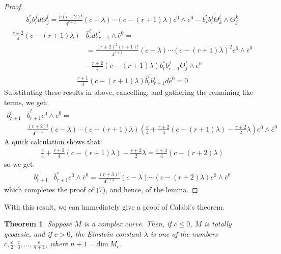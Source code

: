 \documentclass[11pt]{amsart}
\newtheorem{thm}[subsection]{Theorem}
\theoremstyle{definition}
\def \dim{ \text{dim} }
\begin{document}
\begin{proof}
%
\begin{align*}
\bar{b}^i_r b^j_r d \Theta^i_j = \frac{c(r+2)!}{4^{r+2}} (c - \lambda) \cdots (c - (r+1) \lambda) e^0 \wedge \bar{e}^0 - \bar{b}^i_r b^j_r \Theta^i_k \wedge \Theta^k_j
\end{align*}
%
\begin{align*}
\frac{r+2}{4}( c  - (r+1) \lambda ) & \bar{b}^i_r d b^i_{r-1} \wedge \bar{e}^0 = \\
&= \frac{ (r+2)^2 (r+1)!}{4^{r+2}} (c - \lambda) \cdots (c - (r+1) \lambda)^2 e^0 \wedge \bar{e}^0 \\
&- \frac{r+2}{4}(c - (r+1) \lambda) \bar{b}^i_r b^j_{r-1} \Theta^i_j \wedge \bar{e}^0
\end{align*}
%
\begin{align*}
\frac{r+1}{4} (c - (r+1) \lambda ) \bar{b}^i_r b^i_{r+1} d \bar{e}^0 = 0
\end{align*}
%
Substituting these results in above, cancelling, and gathering the remaining like terms, we get:
%
\begin{align*}
b^i_{r+1} & \bar{b}^i_{r+1}  e^0 \wedge \bar{e}^0 = \\
& \frac{(r+2)!}{4^{r+1}} (c- \lambda) \cdots (c - (r+1) \lambda) \left( \frac{c}{4} + \frac{r+2}{4}(c - (r+1) \lambda) - \frac{r + 2}{2} \lambda \right) e^0 \wedge \bar{e}^0
\end{align*}
%
A quick calculation shows that:
%
\begin{align*}
\frac{c}{4} + \frac{r+2}{4}(c - (r+1) \lambda) - \frac{r + 2}{2} \lambda = \frac{r+3}{4}( c - (r+2) \lambda )
\end{align*}
%
so we get:
%
\begin{align*}
b^i_{r+1} & \bar{b}^i_{r+1}  e^0 \wedge \bar{e}^0 = \frac{(r+3)!}{4^{r+2}}(c - \lambda) \cdots (c - (r+2) \lambda) e^0 \wedge \bar{e}^0
\end{align*}
%
which completes the proof of (7), and hence, of the lemma.
%
\end{proof}

With this result, we can immediately give a proof of Calabi's theorem.

\begin{thm} Suppose $M$ is a complex curve.  Then, if $c \leq 0$, $M$ is totally geodesic, and if $c > 0$, the Einstein constant $\lambda$ is one of the numbers $c, \frac{c}{2}, \frac{c}{3}, \ldots, \frac{c}{n + 1}$, where $n + 1 = \dim \ M_c$.
\end{thm}
\end{document}
